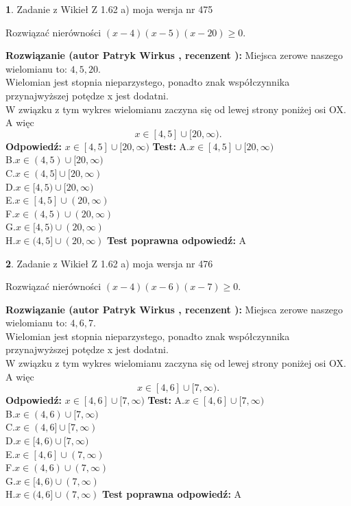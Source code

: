 \documentclass[12pt, a4paper]{article}
\theoremstyle{definition} %
\newtheorem{zad}{}
\newcommand{\zadStart}[1]{\begin{zad}#1\newline}
\newcommand{\zadStop}{\end{zad}}
\newcommand{\rozwStart}[2]{\noindent \textbf{Rozwiązanie (autor #1 , recenzent #2): }\newline}
\newcommand{\rozwStop}{\newline}
\newcommand{\odpStart}{\noindent \textbf{Odpowiedź:}\newline}
\newcommand{\odpStop}{\newline}
\newcommand{\testStart}{\noindent \textbf{Test:}\newline}
\newcommand{\testStop}{\newline}
\newcommand{\kluczStart}{\noindent \textbf{Test poprawna odpowiedź:}\newline}
\newcommand{\kluczStop}{\newline}
\begin{document}
\zadStart{Zadanie z Wikieł Z 1.62 a) moja wersja nr 475}

Rozwiązać nierówności $(x-4)(x-5)(x-20)\ge0$.
\zadStop
\rozwStart{Patryk Wirkus}{}
Miejsca zerowe naszego wielomianu to: $4, 5, 20$.\\
Wielomian jest stopnia nieparzystego, ponadto znak współczynnika przy\linebreak najwyższej potędze x jest dodatni.\\ W związku z tym wykres wielomianu zaczyna się od lewej strony poniżej osi OX. A więc $$x \in [4,5] \cup [20,\infty).$$
\rozwStop
\odpStart
$x \in [4,5] \cup [20,\infty)$
\odpStop
\testStart
A.$x \in [4,5] \cup [20,\infty)$\\
B.$x \in (4,5) \cup [20,\infty)$\\
C.$x \in (4,5] \cup [20,\infty)$\\
D.$x \in [4,5) \cup [20,\infty)$\\
E.$x \in [4,5] \cup (20,\infty)$\\
F.$x \in (4,5) \cup (20,\infty)$\\
G.$x \in [4,5) \cup (20,\infty)$\\
H.$x \in (4,5] \cup (20,\infty)$
\testStop
\kluczStart
A
\kluczStop



\zadStart{Zadanie z Wikieł Z 1.62 a) moja wersja nr 476}

Rozwiązać nierówności $(x-4)(x-6)(x-7)\ge0$.
\zadStop
\rozwStart{Patryk Wirkus}{}
Miejsca zerowe naszego wielomianu to: $4, 6, 7$.\\
Wielomian jest stopnia nieparzystego, ponadto znak współczynnika przy\linebreak najwyższej potędze x jest dodatni.\\ W związku z tym wykres wielomianu zaczyna się od lewej strony poniżej osi OX. A więc $$x \in [4,6] \cup [7,\infty).$$
\rozwStop
\odpStart
$x \in [4,6] \cup [7,\infty)$
\odpStop
\testStart
A.$x \in [4,6] \cup [7,\infty)$\\
B.$x \in (4,6) \cup [7,\infty)$\\
C.$x \in (4,6] \cup [7,\infty)$\\
D.$x \in [4,6) \cup [7,\infty)$\\
E.$x \in [4,6] \cup (7,\infty)$\\
F.$x \in (4,6) \cup (7,\infty)$\\
G.$x \in [4,6) \cup (7,\infty)$\\
H.$x \in (4,6] \cup (7,\infty)$
\testStop
\kluczStart
A
\kluczStop
\end{document}
